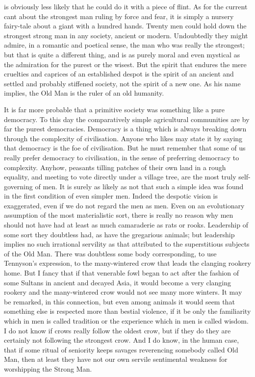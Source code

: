 is obviously less likely that he could do it with a piece of flint. As for the current cant about the strongest man ruling by force and fear, it is simply a nursery fairy-tale about a giant with a hundred hands. Twenty men could hold down the strongest strong man in any society, ancient or modern. Undoubtedly they might admire, in a romantic and poetical sense, the man who was really the strongest; but that is quite a different thing, and is as purely moral and even mystical as the admiration for the purest or the wisest. But the spirit that endures the mere cruelties and caprices of an established despot is the spirit of an ancient and settled and probably stiffened society, not the spirit of a new one. As his name implies, the Old Man is the ruler of an old humanity.

It is far more probable that a primitive society was something like a pure democracy. To this day the comparatively simple agricultural communities are by far the purest democracies. Democracy is a thing which is always breaking down through the complexity of civilisation. Anyone who likes may state it by saying that democracy is the foe of civilisation. But he must remember that some of us really prefer democracy to civilisation, in the sense of preferring democracy to complexity. Anyhow, peasants tilling patches of their own land in a rough equality, and meeting to vote directly under a village tree, are the most truly self-governing of men. It is surely as likely as not that such a simple idea was found in the first condition of even simpler men. Indeed the despotic vision is exaggerated, even if we do not regard the men as men. Even on an evolutionary assumption of the most materialistic sort, there is really no reason why men should not have had at least as much camaraderie as rats or rooks. Leadership of some sort they doubtless had, as have the gregarious animals; but leadership implies no such irrational servility as that attributed to the superstitious subjects of the Old Man. There was doubtless some body corresponding, to use Tennyson's expression, to the many-wintered crow that leads the clanging rookery home. But I fancy that if that venerable fowl began to act after the fashion of some Sultans in ancient and decayed Asia, it would become a very clanging rookery and the many-wintered crow would not see many more winters. It may be remarked, in this connection, but even among animals it would seem that something else is respected more than bestial violence, if it be only the familiarity which in men is called tradition or the experience which in men is called wisdom. I do not know if crows really follow the oldest crow, but if they do they are certainly not following the strongest crow. And I do know, in the human case, that if some ritual of seniority keeps savages reverencing somebody called Old Man, then at least they have not our own servile sentimental weakness for worshipping the Strong Man.

